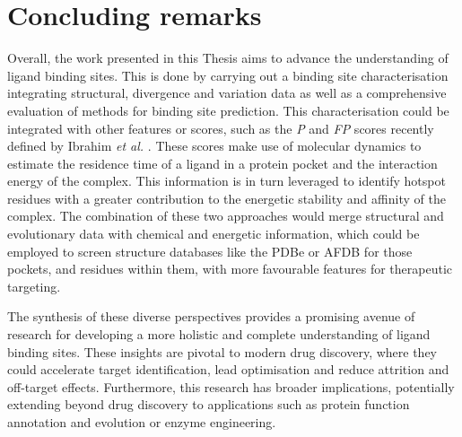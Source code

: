 \section{Concluding remarks}

Overall, the work presented in this Thesis aims to advance the understanding of ligand binding sites. This is done by carrying out a binding site characterisation integrating structural, divergence and variation data as well as a comprehensive evaluation of methods for binding site prediction. This characterisation could be integrated with other features or scores, such as the \textit{P} and \textit{FP} scores recently defined by Ibrahim \textit{et al.} \cite{IBRAHIM_2024_PSCORE, IBRAHIM_2024_FMOPHORE}. These scores make use of molecular dynamics to estimate the residence time of a ligand in a protein pocket and the interaction energy of the complex. This information is in turn leveraged to identify hotspot residues with a greater contribution to the energetic stability and affinity of the complex. The combination of these two approaches would merge structural and evolutionary data with chemical and energetic information, which could be employed to screen structure databases like the PDBe or AFDB for those pockets, and residues within them, with more favourable features for therapeutic targeting.

The synthesis of these diverse perspectives provides a promising avenue of research for developing a more holistic and complete understanding of ligand binding sites. These insights are pivotal to modern drug discovery, where they could accelerate target identification, lead optimisation and reduce attrition and off-target effects. Furthermore, this research has broader implications, potentially extending beyond drug discovery to applications such as protein function annotation and evolution or enzyme engineering.